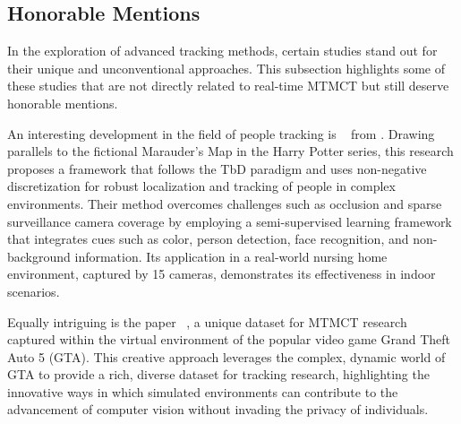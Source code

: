 \subsection{Honorable Mentions}\label{subsec:honorable_mentions}
In the exploration of advanced tracking methods, certain studies stand out for their unique and unconventional approaches. This subsection highlights some of these studies that are not directly related to real-time MTMCT but still deserve honorable mentions.

An interesting development in the field of people tracking is ~\cite{Yu13} from \citeyear{Yu13}. Drawing parallels to the fictional Marauder's Map in the Harry Potter series, this research proposes a framework that follows the TbD paradigm and uses non-negative discretization for robust localization and tracking of people in complex environments. Their method overcomes challenges such as occlusion and sparse surveillance camera coverage by employing a semi-supervised learning framework that integrates cues such as color, person detection, face recognition, and non-background information. Its application in a real-world nursing home environment, captured by 15 cameras, demonstrates its effectiveness in indoor scenarios.

Equally intriguing is the paper ~\cite{Koehl20}, a unique dataset for MTMCT research captured within the virtual environment of the popular video game Grand Theft Auto 5 (GTA). This creative approach leverages the complex, dynamic world of GTA to provide a rich, diverse dataset for tracking research, highlighting the innovative ways in which simulated environments can contribute to the advancement of computer vision without invading the privacy of individuals.